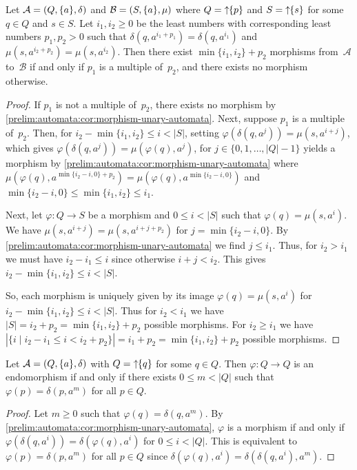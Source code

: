\begin{corollary} \label{prelim:automata:cor:morphism-unary-automata}
	Let $\mathcal A = (Q, \{a\}, \delta)$
	and $\mathcal B = (S, \{a\}, \mu)$
	where $Q = \mbox{\ensuremath{\displaystyle \uparrow \!\!\{p\}}}$ 
	and $S = \mbox{\ensuremath{\displaystyle \uparrow \!\!\{s\}}}$
	for some $q \in Q$ and $s \in S$.
	Let  $i_1, i_2 \ge 0$ be the least numbers with corresponding least numbers $p_1,p_2 > 0$ 
	such that $\delta(q, a^{i_1 + p_1}) = \delta(q, a^{i_1})$
	and $\mu(s, a^{i_2 + p_2}) = \mu(s, a^{i_2})$.
	Then there exist $\min\{i_1, i_2\} + p_2$
	morphisms from~$\mathcal A$ to~$\mathcal B$ 
	if and only if $p_1$ is a multiple of~$p_2$,
	and there exists no morphism otherwise.
\end{corollary}
\begin{proof}
	If $p_1$ is not a multiple of~$p_2$,
	there exists no morphism by \cref{prelim:automata:cor:morphism-unary-automata}.
	Next, suppose $p_1$ is a multiple of~$p_2$.
	Then, for $i_2 - \min\{i_1, i_2\} \le i < |S|$,
	setting $\varphi(\delta(q, a^j)) = \mu(s, a^{i + j})$,
	which gives  $\varphi(\delta(q, a^j)) = \mu(\varphi(q), a^j)$,
	for $j \in \{0,1,\ldots,|Q|-1\}$
	yields a morphism by \cref{prelim:automata:cor:morphism-unary-automata}
	where $\mu(\varphi(q), a^{\min\{i_2 - i, 0\} + p_2}) = \mu(\varphi(q), a^{\min\{i_2 - i,0\}})$
	and $\min\{i_2 - i, 0\} \le \min\{i_1, i_2\} \le i_1$.
	
	Next, let $\varphi \colon Q \to S$ be a morphism
	and $0 \le i <|S|$ such that $\varphi(q) = \mu(s, a^i)$.
	We have $\mu(s, a^{i + j}) = \mu(s, a^{i + j + p_2})$
	for $j = \min\{i_2 - i, 0\}$.
	By \cref{prelim:automata:cor:morphism-unary-automata} we find $j \le i_1$.
	Thus, for $i_2 > i_1$ we must have $i_2 - i_1 \le i$
	since otherwise $i + j < i_2$.
	This gives $i_2 - \min\{i_1, i_2\} \le i < |S|$.
	
	So, each morphism is uniquely
	given by its image 
	$\varphi(q) = \mu(s, a^i)$
	for $i_2 - \min\{i_1, i_2\} \le i < |S|$.
	Thus for $i_2 < i_1$
	we have $|S| = i_2 + p_2 = \min\{i_1, i_2\} + p_2$ 
	possible morphisms.
	For $i_2 \ge i_1$
	we have $|\{ i \mid i_2 - i_1 \le i < i_2 + p_2 \}| =i_1 + p_2 = \min\{i_1, i_2\} + p_2$
	possible morphisms.	
\end{proof}

\begin{corollary} \label{prelim:automata:cor:endo-unary-automata}
	Let $\mathcal A = (Q, \{a\}, \delta)$
	with $Q = \mbox{\ensuremath{\displaystyle \uparrow \!\!\{q\}}}$ for some $q \in Q$.
	Then $\varphi \colon Q \to Q$ is an endomorphism
	if and only if there exists $0 \le m < |Q|$ such that
	$\varphi(p) = \delta(p, a^m)$
	for all $p \in Q$.
\end{corollary}
\begin{proof}
	Let $m \ge 0$ such that $\varphi(q) = \delta(q, a^m)$.
	By \cref{prelim:automata:cor:morphism-unary-automata}, $\varphi$
	is a morphism if and only if $\varphi(\delta(q, a^i)) = \delta(\varphi(q), a^i)$
	for $0 \le i < |Q|$.
	This is equivalent to $\varphi(p) = \delta(p, a^m)$
	for all $p \in Q$ since $\delta(\varphi(q), a^i) = \delta(\delta(q, a^i), a^m)$.
\end{proof}

